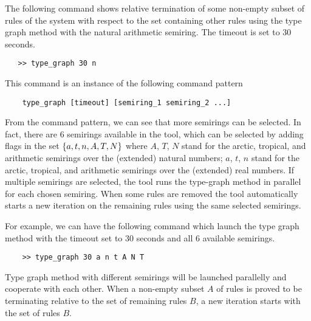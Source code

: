 The following command shows relative termination of some non-empty subset of rules of the system with respect to the set containing other rules using the type graph method with the natural arithmetic semiring. The timeout is set to 30 seconds.
 \begin{verbatim}
   >> type_graph 30 n
\end{verbatim}
This command is an instance of the following command pattern
\begin{verbatim}
    type_graph [timeout] [semiring_1 semiring_2 ...]
\end{verbatim}
From the command pattern, we can see that more semirings can be selected. In fact, there are 6 semirings available in the tool, which can be selected by adding flags in the set $\{a,t,n,A,T,N\}$ where $A$, $T$, $N$ stand for the arctic, tropical, and arithmetic semirings over the (extended) natural numbers;  $a$, $t$, $n$ stand for the arctic, tropical, and arithmetic semirings over the (extended) real numbers. If multiple semirings are selected, the tool runs the type-graph method in parallel for each chosen semiring. When some rules are removed the tool automatically starts a new iteration on the remaining rules using the same selected semirings. 

For example, we can have the following command which launch the type graph method with the timeout set to 30 seconds and all 6 available semirings.
\begin{verbatim} 
    >> type_graph 30 a n t A N T
\end{verbatim}
Type graph method with different semirings will be launched parallelly and cooperate with each other. When a non-empty subset $A$ of rules is proved to be terminating relative to the set of remaining rules $B$, a new iteration starts with the set of rules $B$.

